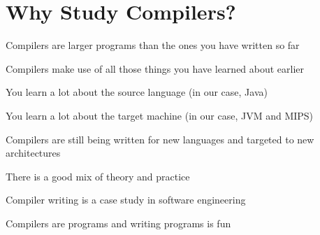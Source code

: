 \documentclass[8pt,a4paper,compress]{beamer}
\begin{document}
\section{Why Study Compilers?}
\begin{frame}[fragile]
\pause

Compilers are larger programs than the ones you have written so far

\pause\bigskip

Compilers make use of all those things you have learned about earlier

\pause\bigskip

You learn a lot about the source language (in our case, Java)

\pause\bigskip

You learn a lot about the target machine (in our case, JVM and MIPS)

\pause\bigskip

Compilers are still being written for new languages and targeted to new architectures

\pause\bigskip

There is a good mix of theory and practice

\pause\bigskip

Compiler writing is a case study in software engineering

\pause\bigskip

Compilers are programs and writing programs is fun
\end{frame}
\end{document}
